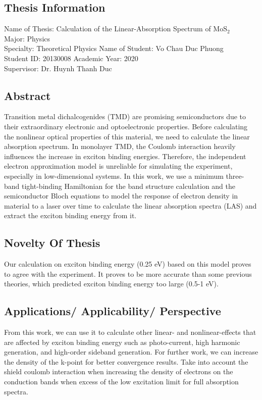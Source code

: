 \documentclass[12pt,english,a4paper]{article}
\begin{document}
	\newpage
	\pagestyle{plain}
	\tableofcontents
	\newpage
	\begin{center}
		\listoffigures
		\listoftables
	\end{center}
	\newpage
	\begin{center}
		\section*{Thesis Information}
	\end{center}
\quad Name of Thesis: Calculation of the Linear-Absorption Spectrum of $\mathrm{MoS}_2$\\\null
\quad Major: Physics\\\null
\quad Specialty: Theoretical Physics
\quad Name of Student: Vo Chau Duc Phuong\\\null
\quad Student ID: 20130008
\quad Academic Year: 2020\\\null
\quad Supervisor: Dr. Huynh Thanh Duc \\\null
\subsection*{Abstract}
\quad Transition metal dichalcogenides (TMD) are promising semiconductors due to their extraordinary electronic and optoelectronic properties. Before calculating the nonlinear optical properties of this material, we need to calculate the linear absorption spectrum. In monolayer TMD, the Coulomb interaction heavily influences the increase in exciton binding energies. Therefore, the independent electron approximation model is unreliable for simulating the experiment, especially in low-dimensional systems. In this work, we use a minimum three-band tight-binding Hamiltonian for the band structure calculation and the semiconductor Bloch equations to model the response of electron density in material to a laser over time to calculate the linear absorption spectra (LAS) and extract the exciton binding energy from it.
\subsection*{Novelty Of Thesis}
\quad Our calculation on exciton binding energy (0.25 eV) based on this model proves to agree with the experiment. It proves to be more accurate than some previous theories, which predicted exciton binding energy too large (0.5-1 eV).
\subsection*{Applications/ Applicability/ Perspective}
\quad From this work, we can use it to calculate other linear- and nonlinear-effects that are affected by exciton binding energy such as photo-current, high harmonic generation, and high-order sideband generation. For further work, we can increase the density of the k-point for better convergence results. Take into account the shield coulomb interaction when increasing the density of electrons on the conduction bands when excess of the low excitation limit for full absorption spectra.\\\null\newpage
\end{document}
